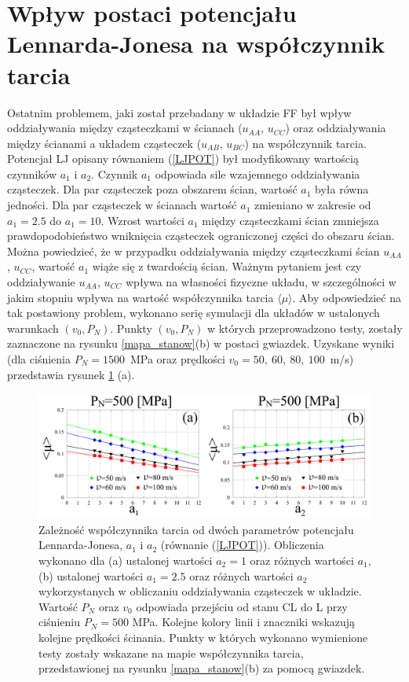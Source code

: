 \documentclass[12pt,a4paper,openright]{report} %
\begin{document}
\section{Wpływ postaci potencjału Lennarda-Jonesa na współczynnik tarcia}
\label{a1a2}
%
%
Ostatnim problemem, jaki został przebadany w układzie FF był wpływ oddziaływania między cząsteczkami w ścianach ($u_{AA}$, $u_{CC}$) oraz oddziaływania między ścianami a układem cząsteczek ($u_{AB}$, $u_{BC}$) na współczynnik tarcia.
\\
Potencjał LJ opisany równaniem (\ref{LJPOT}) był modyfikowany wartością czynników $a_1$ i $a_2$. 
Czynnik $a_1$ odpowiada sile wzajemnego oddziaływania cząsteczek. Dla par cząsteczek poza obszarem ścian, wartość $a_1$ była równa jedności. Dla par cząsteczek w ścianach wartość $a_1$ zmieniano w zakresie od $a_1=2.5$ do $a_1=10$. Wzrost wartości $a_1$ między cząsteczkami ścian zmniejsza prawdopodobieństwo wniknięcia cząsteczek ograniczonej części do obszaru ścian. Można powiedzieć, że w przypadku oddziaływania między cząsteczkami ścian $u_{AA}$, $u_{CC}$, wartość $a_1$ wiąże się z twardością ścian. Ważnym pytaniem jest czy oddziaływanie $u_{AA}$, $u_{CC}$ wpływa na własności fizyczne układu, w szczególności w jakim stopniu wpływa na wartość współczynnika tarcia $\langle \mu \rangle$. Aby odpowiedzieć na tak postawiony problem, wykonano serię symulacji dla układów w ustalonych warunkach $(v_0, P_N)$. Punkty $(v_0, P_N)$ w których przeprowadzono testy, zostały zaznaczone na rysunku \ref{mapa_stanow}(b) w postaci gwiazdek. Uzyskane wyniki (dla ciśnienia $P_N=1500$~MPa oraz prędkości $v_0=50,~60,~80,~100$~m/s) przedstawia rysunek \ref{twardosc} (a). 
%
\begin{figure}[h]
\centering
\includegraphics[width=160mm]{rysunki/PRE16_fig9.pdf}
\caption{Zależność współczynnika tarcia od dwóch parametrów potencjału Lennarda-Jonesa, $a_1$ i $a_2$ (równanie (\ref{LJPOT})). Obliczenia wykonano dla (a) ustalonej wartości $a_2=1$ oraz różnych wartości $a_1$, (b) ustalonej wartości $a_1=2.5$ oraz różnych wartości $a_2$ wykorzystanych w obliczaniu oddziaływania cząsteczek w układzie. Wartość $P_N$ oraz $v_0$ odpowiada przejściu od stanu CL do L przy ciśnieniu $P_N=500$ MPa. Kolejne kolory linii i znaczniki wskazują kolejne prędkości ścinania. Punkty w których wykonano wymienione testy zostały wskazane na mapie współczynnika tarcia, przedstawionej na rysunku \ref{mapa_stanow}(b) za pomocą gwiazdek.}
\label{twardosc}
\end{figure}
\end{document}
